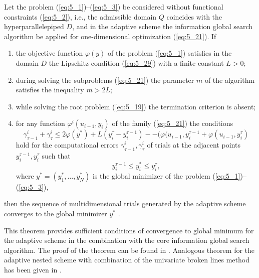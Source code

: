 \begin{theorem}
\label{theor:5_2}
Let the problem (\ref{eq:5_1})--(\ref{eq:5_3}) be considered without functional constraints (\ref{eq:5_2}), i.e., the admissible domain $Q$ coincides with the hyperparallelepiped $D$, and in the adaptive scheme  the information global search algorithm \cite{5_GriKvaMukhStr, 5_StrSergMon2000} be applied for one-dimensional optimization (\ref{eq:5_21}). If
\begin{enumerate}
\item {the objective function $\varphi(y)$  of the problem (\ref{eq:5_1}) satisfies in the domain $D$  the Lipschitz condition (\ref{eq:5_29}) with a finite constant $L>0$;}
\item {during solving the subproblems (\ref{eq:5_21}) the parameter $m$ of the algorithm satisfies the inequality $m>2L$;}
\item {while solving the root problem (\ref{eq:5_19}) the termination criterion is absent;}
\item {for any function $\varphi^i(u_{i-1},y_i)$  of the family (\ref{eq:5_21}) the conditions 
\begin{equation}
\label{eq:5_35}
\gamma_{\tau-1}^i+\gamma_\tau^i\leq 2\varphi(y^*)+L(y_i^\tau-y_i^{\tau-1})--(\varphi(u_{i-1},y_i^{\tau-1}+\varphi(u_{i-1},y_i^\tau)
\end{equation}
hold for the computational errors $\gamma_{\tau-1}^i,\gamma_\tau^i$  of trials at the adjacent points $ y_i^{\tau-1},y_i^\tau$ such that
\begin{displaymath}
y_i^{\tau-1}\leq y_i^*\leq y_i^\tau,
\end{displaymath}
where $y^*=(y_1^*,\ldots,y_N^*)$  is the global minimizer of the problem (\ref{eq:5_1})--(\ref{eq:5_3}),}
\end{enumerate}
then the sequence of multidimensional trials generated by the adaptive scheme converges to the global minimizer $y^*$ .
\end{theorem}

This theorem provides sufficient conditions of convergence to global minimum for the adaptive scheme in the combination with the core information global search algorithm. The proof of the theorem can be found in \cite{5_GerGriGer}. Analogous theorem for the adaptive nested scheme with combination of the univariate broken lines method \cite{5_Piyavskij} has been given in \cite{5_GriIsrSergAMC}.
